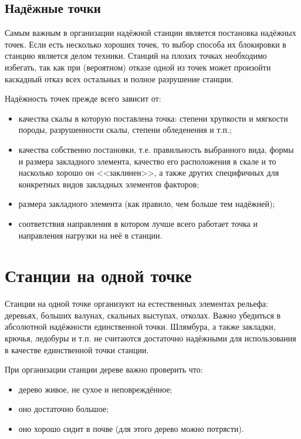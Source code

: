 \documentclass[fleqn, 12pt]{extarticle}
\begin{document}
\subsection{Надёжные точки}
    Самым важным в организации надёжной станции является постановка надёжных точек. Если есть несколько хороших точек, то выбор способа их блокировки в станцию является делом техники.
    Станций на плохих точках необходимо избегать, так как при (вероятном) отказе одной из точек может произойти каскадный отказ всех остальных и полное разрушение станции.

    Надёжность точек прежде всего зависит от:
    \begin{itemize}
        \item качества скалы в которую поставлена точка: степени хрупкости и мягкости породы, разрушенности скалы, степени обледенения и т.п.;
        \item качества собственно постановки, т.е. правильность выбранного вида, формы и размера закладного элемента, качество его расположения в скале и
              то насколько хорошо он <<заклинен>>, а также других специфичных для конкретных видов закладных элементов факторов;
        \item размера закладного элемента (как правило, чем больше тем надёжней);
        \item соответствия направления в котором лучше всего работает точка и направления нагрузки на неё в станции.
    \end{itemize}

\section{Станции на одной точке}
    Станции на одной точке организуют на естественных элементах рельефа: деревьях, больших валунах, скальных выступах, отколах. Важно убедиться в абсолютной надёжности единственной точки. 
    Шлямбура, а также закладки, крючья, ледобуры и т.п. не считаются достаточно надёжными для использования в качестве единственной точки станции.

   	При организации станции дереве важно проверить что:
    \begin{itemize}
        \item дерево живое, не сухое и неповреждённое;
        \item оно достаточно большое;
        \item оно хорошо сидит в почве (для этого дерево можно потрясти).
    \end{itemize}
    
\end{document}
